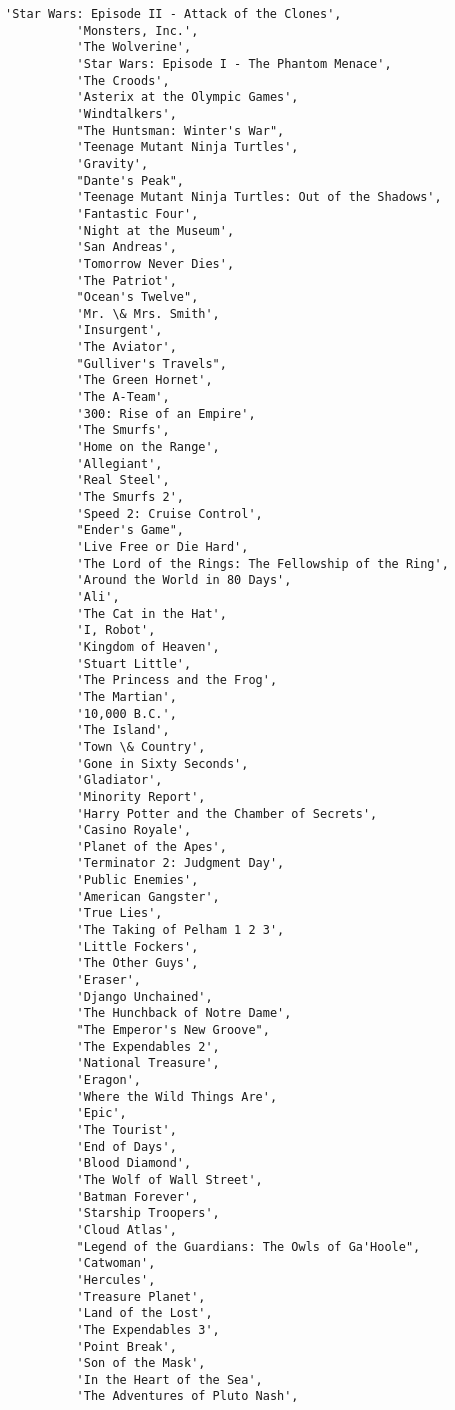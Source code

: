 \documentclass[11pt]{article}
\begin{document}
\begin{Verbatim}[commandchars=\\\{\}]
          'Star Wars: Episode II - Attack of the Clones',
          'Monsters, Inc.',
          'The Wolverine',
          'Star Wars: Episode I - The Phantom Menace',
          'The Croods',
          'Asterix at the Olympic Games',
          'Windtalkers',
          "The Huntsman: Winter's War",
          'Teenage Mutant Ninja Turtles',
          'Gravity',
          "Dante's Peak",
          'Teenage Mutant Ninja Turtles: Out of the Shadows',
          'Fantastic Four',
          'Night at the Museum',
          'San Andreas',
          'Tomorrow Never Dies',
          'The Patriot',
          "Ocean's Twelve",
          'Mr. \& Mrs. Smith',
          'Insurgent',
          'The Aviator',
          "Gulliver's Travels",
          'The Green Hornet',
          'The A-Team',
          '300: Rise of an Empire',
          'The Smurfs',
          'Home on the Range',
          'Allegiant',
          'Real Steel',
          'The Smurfs 2',
          'Speed 2: Cruise Control',
          "Ender's Game",
          'Live Free or Die Hard',
          'The Lord of the Rings: The Fellowship of the Ring',
          'Around the World in 80 Days',
          'Ali',
          'The Cat in the Hat',
          'I, Robot',
          'Kingdom of Heaven',
          'Stuart Little',
          'The Princess and the Frog',
          'The Martian',
          '10,000 B.C.',
          'The Island',
          'Town \& Country',
          'Gone in Sixty Seconds',
          'Gladiator',
          'Minority Report',
          'Harry Potter and the Chamber of Secrets',
          'Casino Royale',
          'Planet of the Apes',
          'Terminator 2: Judgment Day',
          'Public Enemies',
          'American Gangster',
          'True Lies',
          'The Taking of Pelham 1 2 3',
          'Little Fockers',
          'The Other Guys',
          'Eraser',
          'Django Unchained',
          'The Hunchback of Notre Dame',
          "The Emperor's New Groove",
          'The Expendables 2',
          'National Treasure',
          'Eragon',
          'Where the Wild Things Are',
          'Epic',
          'The Tourist',
          'End of Days',
          'Blood Diamond',
          'The Wolf of Wall Street',
          'Batman Forever',
          'Starship Troopers',
          'Cloud Atlas',
          "Legend of the Guardians: The Owls of Ga'Hoole",
          'Catwoman',
          'Hercules',
          'Treasure Planet',
          'Land of the Lost',
          'The Expendables 3',
          'Point Break',
          'Son of the Mask',
          'In the Heart of the Sea',
          'The Adventures of Pluto Nash',

\end{Verbatim}
\end{document}
